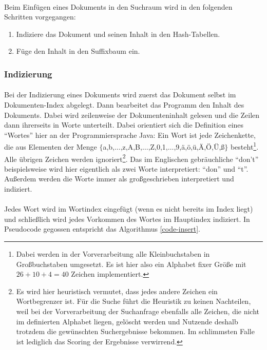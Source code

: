 \paragraph{} Beim Einfügen eines Dokuments in den Suchraum wird in den folgenden Schritten vorgegangen:
\begin{enumerate}
 \item Indiziere das Dokument und seinen Inhalt in den Hash-Tabellen.
 \item Füge den Inhalt in den Suffixbaum ein.
\end{enumerate}

\subsubsection{Indizierung}
\label{algo-index}

\paragraph{} Bei der Indizierung eines Dokuments wird zuerst das Dokument selbst im Dokumenten-Index abgelegt. Dann bearbeitet das Programm den Inhalt des Dokuments. Dabei wird zeilenweise der Dokumenteninhalt gelesen und die Zeilen dann ihrerseits in Worte unterteilt. Dabei orientiert sich die Definition eines "`Wortes"' hier an der Programmiersprache Java: Ein Wort ist jede Zeichenkette, die aus Elementen der Menge $\lbrace$a,b,$\dots$,z,A,B,$\dots$,Z,0,1,$\dots$,9,ä,ö,ü,Ä,Ö,Ü,ß$\rbrace$ besteht\footnote{ Dabei werden in der Vorverarbeitung alle Kleinbuchstaben in Großbuchstaben umgesetzt. Es ist hier also ein Alphabet fixer Größe mit $26 + 10 + 4 = 40$ Zeichen implementiert.}. Alle übrigen Zeichen werden ignoriert\footnote{ Es wird hier heuristisch vermutet, dass jedes andere Zeichen ein Wortbegrenzer ist. Für die Suche führt die Heuristik zu keinen Nachteilen, weil bei der Vorverarbeitung der Suchanfrage ebenfalls alle Zeichen, die nicht im definierten Alphabet liegen, gelöscht werden und Nutzende deshalb trotzdem die gewünschten Suchergebnisse bekommen. Im schlimmsten Falle ist lediglich das Scoring der Ergebnisse verwirrend.}. Das im Englischen gebräuchliche "`don't"' beispielsweise wird hier eigentlich als zwei Worte interpretiert: "`don"' und "`t"'. Außerdem werden die Worte immer als großgeschrieben interpretiert und indiziert.
\paragraph{} Jedes Wort wird im Wortindex eingefügt (wenn es nicht bereits im Index liegt) und schließlich wird jedes Vorkommen des Wortes im Hauptindex indiziert. In Pseudocode gegossen entspricht das Algorithmus \ref{code-insert}.

